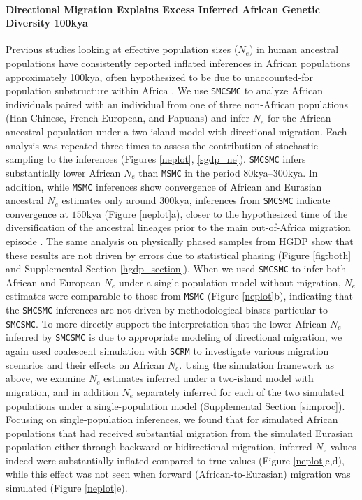 \documentclass{article}
\begin{document}
\paragraph{Directional Migration Explains Excess Inferred African Genetic Diversity 100kya} Previous studies looking at effective population sizes ($N_e$) in human ancestral populations have consistently reported inflated inferences in African populations approximately 100kya, often hypothesized to be due to unaccounted-for population substructure within Africa \cite{Li2011,Schiffels2014}. We use {\tt SMCSMC} to analyze African individuals paired with an individual from one of three non-African populations (Han Chinese, French European, and Papuans) and infer $N_e$ for the African ancestral population under a two-island model with directional migration.  Each analysis was repeated three times to assess the contribution of stochastic sampling to the inferences (Figures \ref{neplot}, \ref{sgdp_ne}). {\tt SMCSMC} infers substantially lower African $N_e$ than {\tt MSMC} in the period $80$kya--$300$kya.  In addition, while {\tt MSMC} inferences show convergence of African and Eurasian ancestral $N_e$ estimates only around $300$kya, inferences from {\tt SMCSMC} indicate convergence at $150$kya (Figure \ref{neplot}a), closer to the hypothesized time of the diversification of the ancestral lineages prior to the main out-of-Africa migration episode \cite{Timmermann2016, Malaspinas2016}. The same analysis on physically phased samples from HGDP show that these results are not driven by errors due to statistical phasing (Figure \ref{fig:both} and Supplemental Section \ref{hgdp_section}). When we used {\tt SMCSMC} to infer both African and European $N_e$ under a single-population model without migration, $N_e$ estimates were comparable to those from {\tt MSMC} (Figure \ref{neplot}b), indicating that the {\tt SMCSMC} inferences are not driven by methodological biases particular to {\tt SMCSMC}.
To more directly support the interpretation that the lower African $N_e$ inferred by {\tt SMCSMC} is due to appropriate modeling of directional migration, we again used coalescent simulation with {\tt SCRM} to investigate various migration scenarios and their effects on African $N_e$. Using the simulation framework as above, we examine $N_e$ estimates inferred under a two-island model with migration, and in addition $N_e$ separately inferred for each of the two simulated populations under a single-population model (Supplemental Section \ref{simproc}).  Focusing on single-population inferences, we found that for simulated African populations that had received substantial migration from the simulated Eurasian population either through backward or bidirectional migration, inferred $N_e$ values indeed were substantially inflated compared to true values (Figure \ref{neplot}c,d), while this effect was not seen when forward (African-to-Eurasian) migration was simulated (Figure \ref{neplot}e).  
\end{document}

